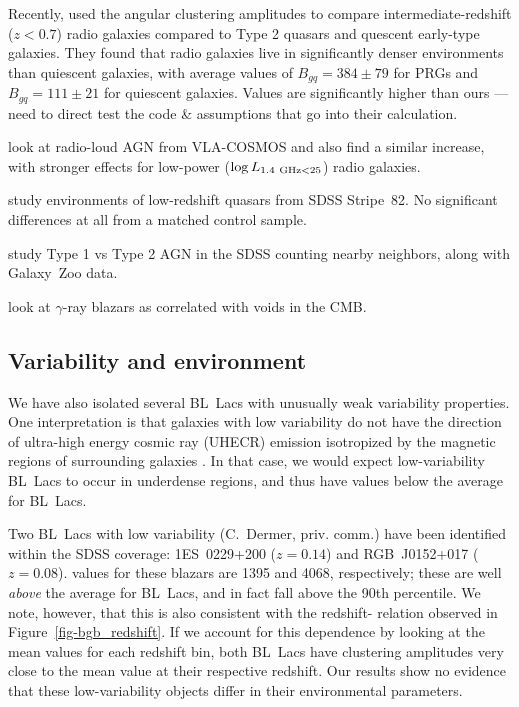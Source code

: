 \documentclass{emulateapj}
\begin{document}
Recently, \citet{ram13} used the angular clustering amplitudes to compare intermediate-redshift ($z<0.7$) radio galaxies compared to Type 2 quasars and quescent early-type galaxies. They found that radio galaxies live in significantly denser environments than quiescent galaxies, with average values of $B_{gq}=384\pm79$ for PRGs and $B_{gq}=111\pm21$ for quiescent galaxies. Values are significantly higher than ours --- need to direct test the code \& assumptions that go into their calculation. 

\cite{mal15} look at radio-loud AGN from VLA-COSMOS and also find a similar increase, with stronger effects for low-power ($\log L_{1.4~{\rm GHz} < 25}$) radio galaxies. 

\citet{kar14a} study environments of low-redshift quasars from SDSS Stripe~82. No significant differences at all from a matched control sample.

\citet{vil14a} study Type 1 vs Type 2 AGN in the SDSS counting nearby neighbors, along with Galaxy~Zoo data. 

\citet{fur14} look at $\gamma$-ray blazars as correlated with voids in the CMB. 

\subsection{Variability and environment}

We have also isolated several BL~Lacs with unusually weak variability properties. One interpretation is that galaxies with low variability do not have the direction of ultra-high energy cosmic ray (UHECR) emission isotropized by the magnetic regions of surrounding galaxies \citep{raz12}. In that case, we would expect low-variability BL~Lacs to occur in underdense regions, and thus have \bgb{} values below the average for BL~Lacs.  

Two BL~Lacs with low variability (C.~Dermer, priv. comm.) have been identified within the SDSS coverage: 1ES~0229+200 ($z=0.14$) and RGB~J0152+017 ($z=0.08$). \bgb{} values for these blazars are 1395 and 4068, respectively; these are well {\it above} the average \bgb{} for BL~Lacs, and in fact fall above the 90th percentile. We note, however, that this is also consistent with the redshift-\bgb{} relation observed in Figure~\ref{fig-bgb_redshift}. If we account for this dependence by looking at the mean \bgb{} values for each redshift bin, both BL~Lacs have clustering amplitudes very close to the mean value at their respective redshift. Our results show no evidence that these low-variability objects differ in their environmental parameters.  
\end{document}
